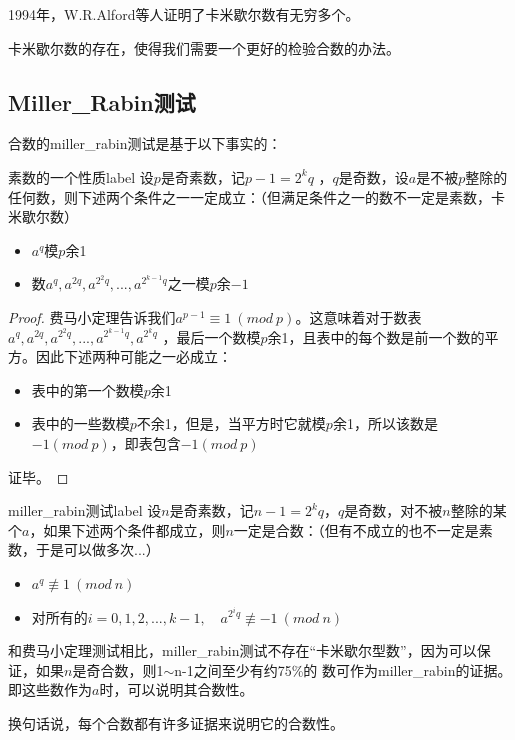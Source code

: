1994年，W.R.Alford等人证明了卡米歇尔数有无穷多个。

卡米歇尔数的存在，使得我们需要一个更好的检验合数的办法。

\subsection{Miller\_Rabin测试}
合数的miller\_rabin测试是基于以下事实的：

\begin{theorem}{素数的一个性质}{label}
设$p$是奇素数，记$p-1=2^kq$ ，$q$是奇数，{\heiti 设$a$是不被$p$整除的任何数}，则下述两个条件之一一定成立：（但满足条件之一的数不一定是素数，卡米歇尔数）
\begin{itemize}
	\item $a^q$模$p$余1
	\item 数$a^q,a^{2q},a^{2^2q},...,a^{2^{k-1}q}$之一模$p$余$-1$
\end{itemize}
\end{theorem}

\begin{proof}
	费马小定理告诉我们$a^{p-1}\equiv 1\ (mod \ p)$。这意味着对于数表$a^q,a^{2q},a^{2^2q},...,a^{2^{k-1}q},a^{2^kq}$ ，最后一个数模$p$余1，且表中的每个数是前一个数的平方。因此下述两种可能之一必成立：
\begin{itemize}
	\item 表中的第一个数模$p$余1
	\item 表中的一些数模$p$不余1，但是，当平方时它就模$p$余1，所以该数是$-1(mod \ p)$，即表包含$-1(mod \ p)$
\end{itemize}
	证毕。
\end{proof}

\begin{theorem}{miller\_rabin测试}{label}
	设$n$是奇素数，记$n-1=2^kq$，$q$是奇数，对不被$n$整除的某个$a$，如果下述{\heiti 两个条件都成立}，则$n$一定是合数：（但有不成立的也不一定是素数，于是可以做多次...）
	\begin{itemize}
		\item $a^q \not\equiv 1 \ (mod \ n)$
		\item 对所有的$i=0,1,2,...,k-1 ,\quad a^{2^iq}\not\equiv -1\ (mod \ n)$
	\end{itemize}
\end{theorem}
和费马小定理测试相比，miller\_rabin测试不存在“卡米歇尔型数”，因为可以保证，如果$n$是奇合数，则1$\sim$n-1之间至少有约75\%的
数可作为miller\_rabin的证据。即这些数作为$a$时，可以说明其合数性。

{\heiti 换句话说，每个合数都有许多证据来说明它的合数性。}

